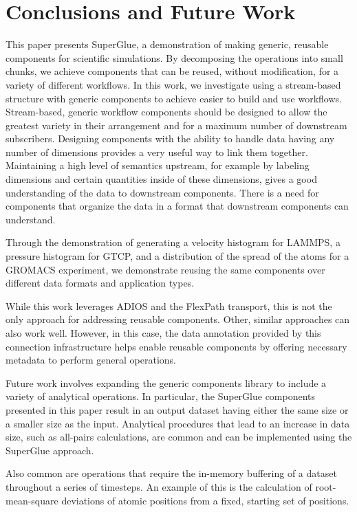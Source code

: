 \section{Conclusions and Future Work}
\label{s:conclusion}

This paper presents SuperGlue, a demonstration of making generic, reusable
components for scientific simulations. By decomposing the operations into small
chunks, we achieve components that can be reused, without modification, for
a variety of different workflows. In this work, we investigate using a
stream-based structure with generic components to achieve easier to build and
use workflows.  Stream-based, generic workflow components should be designed 
to allow the greatest variety in their arrangement and for a maximum
number of downstream subscribers. Designing components with the ability to
handle data having any number of dimensions provides a very useful way to link
them together. Maintaining a high level of semantics upstream, for example by
labeling dimensions and certain quantities inside of these dimensions, gives a
good understanding of the data to downstream components. There is a need for
components that organize the data in a format that downstream components can
understand.

Through the demonstration of generating a velocity histogram for LAMMPS,
a pressure histogram for GTCP,
and a distribution of the spread of the atoms for a GROMACS
experiment,
we demonstrate reusing the same components
over different data formats and application types.

While this work leverages ADIOS and the FlexPath transport, this is not the
only approach for addressing reusable components. Other, similar approaches can
also work well. However, in this case, the data annotation provided by this
connection infrastructure helps enable reusable components by offering
necessary metadata to perform general operations.

Future work involves
expanding the generic components library 
to include a variety of analytical operations.
In particular, the SuperGlue components presented
in this paper
result in an output dataset having either the same
size or a smaller size as the input.
Analytical procedures that lead
to an increase in data size, such as
all-pairs calculations, are common and
can be implemented using the SuperGlue approach.

Also common are operations that require the in-memory
buffering of a dataset throughout a series
of timesteps. An example of this is the
calculation of root-mean-square
deviations of atomic positions from a fixed,
starting set of positions.

